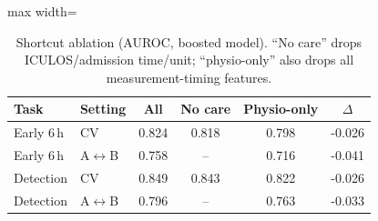 \begin{table}[!t]
\centering\footnotesize\setlength{\tabcolsep}{3pt}
\caption{Shortcut ablation (AUROC, boosted model). ``No care'' drops ICULOS/admission time/unit; ``physio-only'' also drops all measurement-timing features.}
\label{tab:ablation}
\begin{adjustbox}{max width=\linewidth}
\begin{tabular}{llcccc}
\toprule
Task & Setting & All & No care & Physio-only & $\Delta$ \\
\midrule
Early 6\,h & CV & 0.824 & 0.818 & 0.798 & -0.026 \\
Early 6\,h & A$\leftrightarrow$B & 0.758 & -- & 0.716 & -0.041 \\
Detection & CV & 0.849 & 0.843 & 0.822 & -0.026 \\
Detection & A$\leftrightarrow$B & 0.796 & -- & 0.763 & -0.033 \\
\bottomrule
\end{tabular}
\end{adjustbox}
\end{table}
